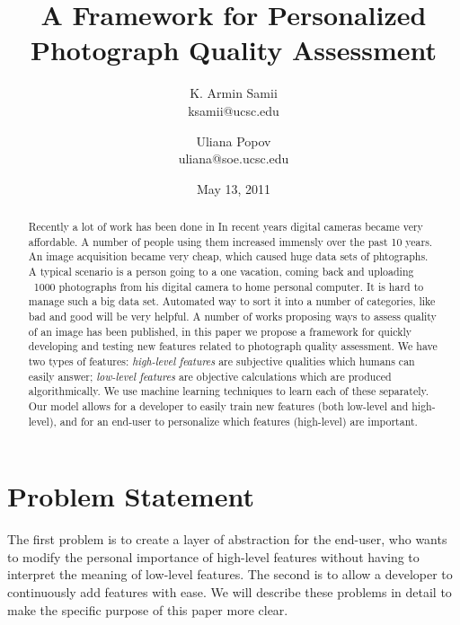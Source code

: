 \documentclass[10pt,twocolumn]{article}
\title{A Framework for Personalized Photograph Quality Assessment}
\author{
K. Armin Samii \\
ksamii@ucsc.edu
\and
Uliana Popov \\
uliana@soe.ucsc.edu}
\date{May 13, 2011}
\begin{document}
\maketitle
\begin{abstract}
Recently a lot of work has been done in 
In recent years digital cameras became very affordable. 
A number of people using them increased immensly over the past 10 years. %
An image acquisition became very cheap, which caused 
huge data sets of phtographs.
A typical scenario is a person going to a one vacation,
coming back and uploading ~1000 photographs from his
digital camera to home personal computer. 
It is hard to manage such a big data set.
Automated way to sort it into a number
of categories, like bad and good will
be very helpful.
A number of works proposing ways to
assess quality of an image has been  
published,
in this paper we propose a framework for quickly developing and testing new features related to photograph quality assessment. We have two types of features: \textit{high-level features} are subjective qualities which humans can easily answer; \textit{low-level features} are objective calculations which are produced algorithmically. We use machine learning techniques to learn each of these separately. Our model allows for a developer to easily train new features (both low-level and high-level), and for an end-user to personalize which features (high-level) are important.



\end{abstract}

\section{Problem Statement}
The first problem is to create a layer of abstraction for the end-user, who wants to modify the personal importance of high-level features without having to interpret the meaning of low-level features. The second is to allow a developer to continuously add features with ease. We will describe these problems in detail to make the specific purpose of this paper more clear.
\end{document}
